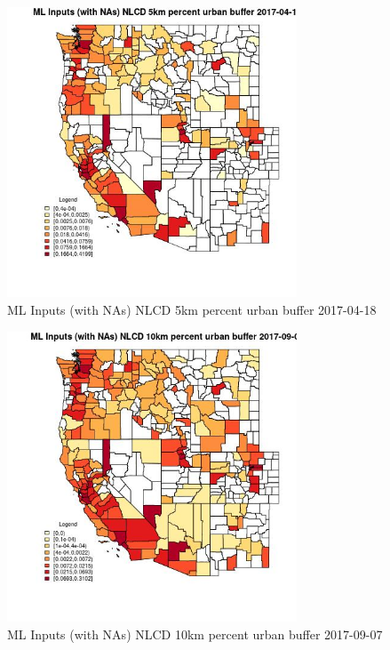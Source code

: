 \begin{figure} 
\centering  
\includegraphics[width=0.77\textwidth]{Code_Outputs/Report_ML_input_PM25_Step4_part_e_de_duplicated_aves_compiled_2019-05-21wNAs_CountyNLCD_5km_percent_urban_bufferMean2017-04-18.jpg} 
\caption{\label{fig:Report_ML_input_PM25_Step4_part_e_de_duplicated_aves_compiled_2019-05-21wNAsCountyNLCD_5km_percent_urban_bufferMean2017-04-18}ML Inputs (with NAs) NLCD 5km percent urban buffer 2017-04-18} 
\end{figure} 
 

\begin{figure} 
\centering  
\includegraphics[width=0.77\textwidth]{Code_Outputs/Report_ML_input_PM25_Step4_part_e_de_duplicated_aves_compiled_2019-05-21wNAs_CountyNLCD_10km_percent_urban_bufferMean2017-09-07.jpg} 
\caption{\label{fig:Report_ML_input_PM25_Step4_part_e_de_duplicated_aves_compiled_2019-05-21wNAsCountyNLCD_10km_percent_urban_bufferMean2017-09-07}ML Inputs (with NAs) NLCD 10km percent urban buffer 2017-09-07} 
\end{figure} 
 

